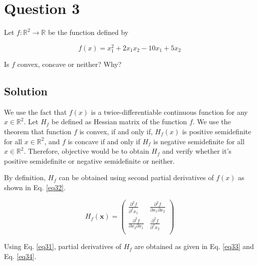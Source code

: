 
\section*{Question 3}

Let $f: \mathbb{R}^2 \rightarrow \mathbb{R}$ be the function defined by

\begin{equation}
f(x) = x_1^2 + 2x_1 x_2 - 10x_1 + 5x_2
\label{eq31}
\end{equation}

Is $f$ convex, concave or neither? Why?

\subsection*{Solution}

We use the fact that $f(x)$ is a twice-differentiable continuous function for any $x\in \mathbb{R}^2$.
Let $H_f$ be defined as Hessian matrix of the function $f$.
We use the theorem that function $f$ is convex, if and only if, $H_f(x)$ is positive semidefinite for all $x\in \mathbb{R}^2$, and $f$ is concave if and only if $H_f$ is negative semidefinite for all $x\in \mathbb{R}^2$.
Therefore, objective would be to obtain $H_f$ and verify whether it's positive semidefinite or negative semidefinite or neither.

By definition, $H_f$ can be obtained using second partial derivatives of $f(x)$ as shown in Eq. \ref{eq32}.

\begin{equation}
H_f(\mathbf{x})
= \begin{pmatrix}
\frac{\partial^2 f}{\partial^2 x_1} & \frac{\partial^2 f}{\partial x_1 \partial x_2}\\[0.6em]
\frac{\partial^2 f}{\partial x_2 \partial x_1} & \frac{\partial^2 f}{\partial^2 x_2}\\
\end{pmatrix}
\label{eq32}
\end{equation}

Using Eq. \ref{eq31}, partial derivatives of $H_f$ are obtained as given in Eq. \ref{eq33} and Eq. \ref{eq34}.

